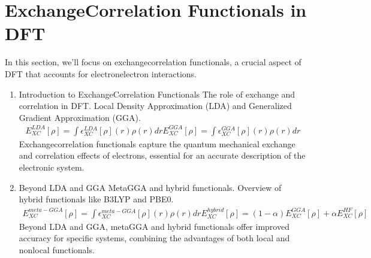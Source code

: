 \documentclass[letterpaper,10pt,english]{sphinxmanual}
\begin{document}
\section{Exchange\sphinxhyphen{}Correlation Functionals in DFT}
\label{\detokenize{dft/dft:exchange-correlation-functionals-in-dft}}
\sphinxAtStartPar
In this section, we’ll focus on exchange\sphinxhyphen{}correlation functionals, a crucial aspect of DFT that accounts for electron\sphinxhyphen{}electron interactions.
\begin{enumerate}
%
\item {} 
\sphinxAtStartPar
Introduction to Exchange\sphinxhyphen{}Correlation Functionals
\sphinxhyphen{} The role of exchange and correlation in DFT.
\sphinxhyphen{} Local Density Approximation (LDA) and Generalized Gradient Approximation (GGA).
\begin{equation*}
\begin{split}E_{XC}^{LDA}[\rho] = \int \epsilon_{XC}^{LDA}[\rho](r) \rho(r) dr
E_{XC}^{GGA}[\rho] = \int \epsilon_{XC}^{GGA}[\rho](r) \rho(r) dr\end{split}
\end{equation*}
\sphinxAtStartPar
Exchange\sphinxhyphen{}correlation functionals capture the quantum mechanical exchange and correlation effects of electrons, essential for an accurate description of the electronic system.

\item {} 
\sphinxAtStartPar
Beyond LDA and GGA
\sphinxhyphen{} Meta\sphinxhyphen{}GGA and hybrid functionals.
\sphinxhyphen{} Overview of hybrid functionals like B3LYP and PBE0.
\begin{equation*}
\begin{split}E_{XC}^{meta-GGA}[\rho] = \int \epsilon_{XC}^{meta-GGA}[\rho](r) \rho(r) dr
E_{XC}^{hybrid}[\rho] = (1 - \alpha)E_{XC}^{GGA}[\rho] + \alpha E_{XC}^{HF}[\rho]\end{split}
\end{equation*}
\sphinxAtStartPar
Beyond LDA and GGA, meta\sphinxhyphen{}GGA and hybrid functionals offer improved accuracy for specific systems, combining the advantages of both local and non\sphinxhyphen{}local functionals.

\end{enumerate}
\end{document}
